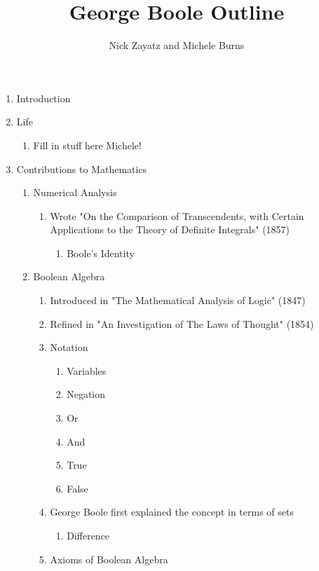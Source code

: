 \documentclass[12]{article} %
\title{George Boole Outline}
\author{Nick Zayatz and Michele Burns}
\begin{document}
\maketitle %

\begin{enumerate}
\item{Introduction}

\item{Life}
    \begin{enumerate}
    \item{Fill in stuff here Michele!}
    \end{enumerate}

\item{Contributions to Mathematics}
    \begin{enumerate}
    \item{Numerical Analysis}
    	\begin{enumerate}
  	\item{Wrote "On the Comparison of Transcendents, with Certain Applications to the Theory of Definite Integrals" (1857)}
		\begin{enumerate}
		\item{Boole's Identity}
		\end{enumerate}
	\end{enumerate}
    \item{Boolean Algebra}
        \begin{enumerate}
        \item{Introduced in "The Mathematical Analysis of Logic" (1847)}
        \item{Refined in "An Investigation of The Laws of Thought" (1854)}
        \item{Notation}
        		\begin{enumerate}
  	  	\item{Variables}
		\item{Negation}
		\item{Or}
		\item{And}
		\item{True}
		\item{False}
    		\end{enumerate}
        \item{George Boole first explained the concept in terms of sets}
        		\begin{enumerate}
  	  	\item{Difference}
		\end{enumerate}
        \item{Axioms of Boolean Algebra}

\end{enumerate}
\end{enumerate}
\end{enumerate}
\end{document}
